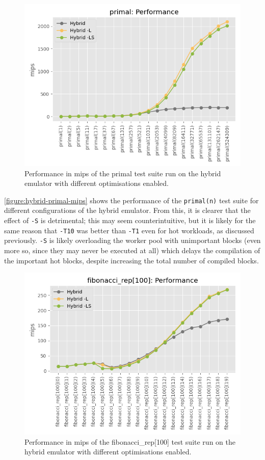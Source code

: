 \begin{figure}[H]
    \centering
    \includegraphics[scale=0.75]{output/graphs/tests/hybrid/primal/mips.png}
    \caption{Performance in mips of the primal test suite run on the hybrid emulator with different optimisations enabled.}
    \label{figure:hybrid-primal-mips}
\end{figure}

\autoref{figure:hybrid-primal-mips} shows the performance of the \texttt{primal(n)} test suite for different configurations of the hybrid emulator. From this, it is clearer that the effect of \texttt{-S} is detrimental; this may seem counterintuitive, but it is likely for the same reason that \texttt{-T10} was better than \texttt{-T1} even for hot workloads, as discussed previously. \texttt{-S} is likely overloading the worker pool with unimportant blocks (even more so, since they may never be executed at all) which delays the compilation of the important hot blocks, despite increasing the total number of compiled blocks.

\begin{figure}[H]
    \centering
    \includegraphics[scale=0.75]{output/graphs/tests/hybrid/fibonacci_rep[100]/mips.png}
    \caption{Performance in mips of the fibonacci\_rep[100] test suite run on the hybrid emulator with different optimisations enabled.}
    \label{figure:hybrid-fibonacci-100-mips}
\end{figure}

